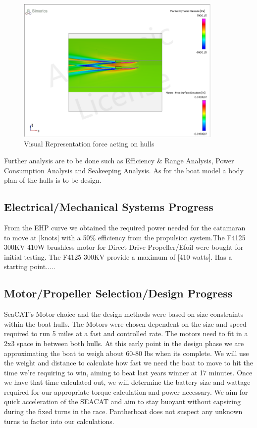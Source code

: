 \documentclass[12pt]{article}
\begin{document}
\begin{figure}[h!]
    \centering
    \includegraphics[width=10cm]{images/02-2023/CFD/55 lbs/Graphs_10knts}
    \caption{Visual Representation force acting on hulls}
    \label{fig:my_label}
\end{figure}

Further analysis are to be done such as Efficiency \& Range Analysis, Power Consumption Analysis and Seakeeping Analysis. As for the boat model a body plan of the hulls is to be design. 



\subsection{Electrical/Mechanical Systems Progress} 
From the EHP curve we obtained the required power needed for the catamaran to move at [knots] with a 50\% efficiency from the propulsion system.The F4125 300KV 410W brushless motor for Direct Drive Propeller/Efoil were bought for initial testing. The F4125 300KV provide a maximum of [410 watts]. Has a starting point..... 

\subsection{Motor/Propeller Selection/Design Progress}
SeaCAT’s Motor choice and the design methods were based on size constraints within the boat hulls. The Motors were chosen dependent on the size and speed required to run 5 miles at a fast and controlled rate. The motors need to fit in a 2x3 space in between both hulls. At this early point in the design phase we are approximating the boat to weigh about 60-80 lbs when its complete. We will use the weight and distance to calculate how fast we need the boat to move to hit the time we're requiring to win, aiming to beat last years winner at 17 minutes. Once we have that time calculated out, we will determine the battery size and wattage required for our appropriate torque calculation and power necessary. We aim for quick acceleration of the SEACAT and aim to stay buoyant without capsizing during the fixed turns in the race.
Pantherboat does not suspect any unknown turns to factor into our calculations.
\end{document}

